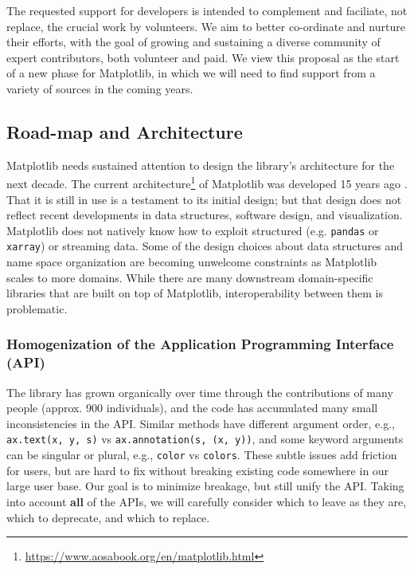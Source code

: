 \documentclass[11pt]{article}  %
\begin{document}
The requested support for developers is intended to complement and
faciliate, not replace, the crucial work by volunteers.  We aim to
better co-ordinate and nurture their
efforts, with the goal of growing and sustaining a diverse community
of expert contributors, both volunteer and paid.  We view
this proposal as the start of a new phase for Matplotlib, in which we
will need to find support from a variety of sources in the coming years.



\subsection{Road-map and Architecture}

Matplotlib needs sustained attention to design the library's
architecture for the next decade.  The current
architecture\footnote{\url{https://www.aosabook.org/en/matplotlib.html}} of
Matplotlib was developed 15 years ago \cite{Hunter:2007}.  That it is
still in use is a testament to its initial design; but that design
does not reflect recent developments in data structures, software
design, and visualization.  Matplotlib does not natively know how to
exploit structured (e.g. \texttt{pandas} or \texttt{xarray}) or
streaming data.  Some of the design choices about data structures and
name space organization are
becoming unwelcome constraints as Matplotlib scales to more domains.  While
there are many downstream domain-specific libraries that are built on
top of Matplotlib, interoperability between them is problematic.


\subsubsection{Homogenization of the Application Programming Interface (API)}
\label{sec:api_hom}
The library has grown organically over time through the contributions
of many people (approx. 900 individuals), and the code has accumulated
many small inconsistencies in the API.  Similar methods have different
argument order, e.g., \texttt{ax.text(x, y, s)} vs
\texttt{ax.annotation(s, (x, y))}, and some keyword arguments can be
singular or plural, e.g., \texttt{color} vs \texttt{colors}.  These
subtle issues add friction for users, but are hard to fix without
breaking existing code somewhere in our large user base.  Our goal is
to minimize breakage, but still unify the API.  Taking into account
\textbf{all} of the APIs, we will carefully consider which to leave as
they are, which to deprecate, and which to replace.
\end{document}
